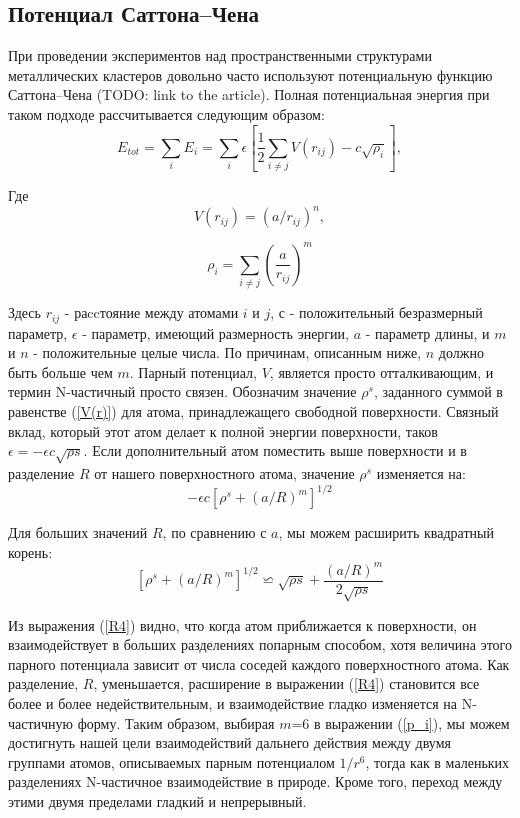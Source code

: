 \subsection{Потенциал Саттона--Чена}
\label{sec:1a}

При проведении экспериментов над пространственными структурами металлических кластеров
довольно часто используют потенциальную функцию Саттона--Чена (TODO: link to the article).
Полная потенциальная энергия при таком подходе рассчитывается следующим образом:
\begin{equation}
\label{Etot}
E_{tot}=\sum_i E_{i} = \sum_i \epsilon \left[\frac12\sum_{i\ne j} V(r_{ij})-c \sqrt{\rho_i}\right],
\end{equation}

Где
\begin{equation}
\label{V(r)}
V(r_{ij})=(a/r_{ij})^n,
\end{equation}

\begin{equation}
\label{p_i}
\rho_i=\sum_{i\ne j}\left(\frac{a}{r_{ij}}\right)^m
\end{equation}

Здесь $r_{ij}$  - раccтояние между атомами $i$ и $j$, $с$ - положительный
безразмерный параметр, $\epsilon$ - параметр, имеющий размерность энергии, $a$
- параметр длины, и $m$ и $n$ - положительные целые числа. По причинам, описанным
ниже, $n$ должно быть больше чем $m$. Парный потенциал, $V$, является просто
отталкивающим, и термин N-частичный просто связен. Обозначим значение $\rho^s$,
заданного суммой в равенстве (\ref{V(r)}) для атома, принадлежащего свободной
поверхности. Связный вклад, который этот атом делает к полной энергии
поверхности, таков $\epsilon=-\epsilon c \sqrt{\rho s}$. Если
дополнительный атом поместить выше поверхности и в разделение $R$ от нашего
поверхностного атома, значение $\rho^s$ изменяется на:
$$-\epsilon c[\rho^s+(a/R)^m]^{1/2}$$

Для больших значений $R$, по сравнению с $a$, мы можем расширить квадратный корень:
\begin{equation}
\label{R4}
[\rho^s+(a/R)^m]^{1/2}\backsimeq \sqrt{\rho s}+ \frac{(a/R)^m}{2\sqrt{\rho s}}
\end{equation}

Из выражения (\ref{R4}) видно, что когда атом приближается к поверхности, он
взаимодействует в больших разделениях попарным способом, хотя величина этого
парного потенциала зависит от числа соседей каждого поверхностного атома. Как
разделение, $R$, уменьшается, расширение в выражении (\ref{R4}) становится все
более и более недействительным, и взаимодействие гладко изменяется на
N-частичную форму. Таким образом, выбирая $m$=6 в выражении (\ref{p_i}), мы можем
достигнуть нашей цели взаимодействий дальнего действия между двумя группами
атомов, описываемых парным потенциалом $1/r^6$, тогда как в маленьких
разделениях N-частичное взаимодействие в природе. Кроме того, переход между
этими двумя пределами гладкий и непрерывный.

